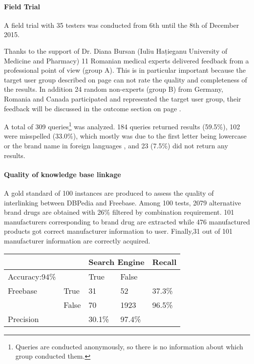 \documentclass[11pt,titlepage,oneside,openany]{book}
\begin{document}
\paragraph{Field Trial}
\label{cha:field_trial}
\label{field_trial}
A field trial with 35 testers was conducted from 6th until the 8th of December 2015.

Thanks to the support of Dr. Diana Bursan (Iuliu Hațieganu University of Medicine and Pharmacy) 11 Romanian medical experts delivered feedback from a professional point of view (group A). This is in particular important because the target user group described on page \pageref{cha:domain} can not rate the quality and completeness of the results.
In addition 24 random non-experts (group B) from Germany, Romania and Canada participated and represented the target user group, their feedback will be discussed in the outcome section on page \pageref{outcome}. 

A total of 309 queries\footnote{Queries are conducted anonymously, so there is no information about which group conducted them.} was analyzed. 184 queries returned results (59.5\%), 102 were misspelled (33.0\%), which mostly was due to the first letter being lowercase or the brand name in foreign languages , and 23 (7.5\%) did not return any results.  

\paragraph{Quality of knowledge base linkage}
\label{cha:gold standard}
A gold standard of 100 instances are produced to assess the quality of interlinking between DBPedia and Freebase. Among 100 tests, 2079 alternative brand drugs are obtained with 26\% filtered by combination requirement. 101 manufacturers corresponding to brand drug are extracted while 476 manufactured products got correct manufacturer information to user.  Finally,31 out of 101 manufacturer information are correctly acquired.
\begin{table}[h]
\centering
\label{my-label}
\begin{tabular}{lllll}
                          &       & \multicolumn{2}{l}{Search Engine} & Recall \\\hline
Accuracy:94\%             &       & True            & False           &       \\\hline
Freebase                  & True  & 31              & 52              & 37.3\%    \\\hline
                          & False & 70              & 1923            & 96.5\%    \\\hline
Precision                &       & 30.1\%          & 97.4\%          &          
\end{tabular}
\end{table}
\end{document}
